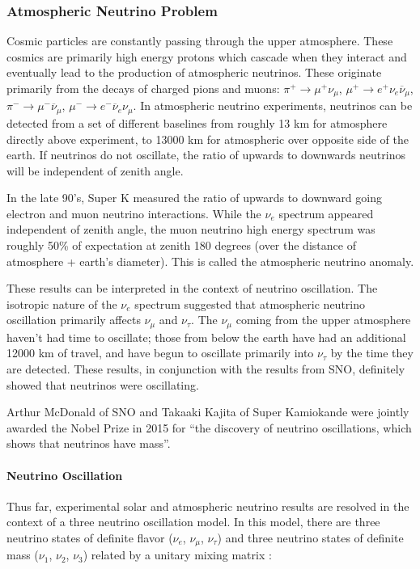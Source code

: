 \subsubsection{Atmospheric Neutrino Problem}
Cosmic particles are constantly passing through the upper atmosphere.  These cosmics are primarily high energy protons which cascade when they interact and eventually lead to the production of atmospheric neutrinos.  These originate primarily from the decays of charged pions and muons: $\pi^+ \rightarrow \mu^+\nu_\mu$, $\mu^+ \rightarrow e^+ \nu_e \overline{\nu}_\mu$, $\pi^- \rightarrow \mu^-\overline{\nu}_\mu$, $\mu^- \rightarrow e^- \overline{\nu}_e \nu_\mu$.  In atmospheric neutrino experiments, neutrinos can be detected from a set of different baselines from roughly 13 km for atmosphere directly above experiment, to 13000 km for atmospheric over opposite side of the earth.  If neutrinos do not oscillate, the ratio of upwards to downwards neutrinos will be independent of zenith angle.
\par In the late 90's, Super K measured the ratio of upwards to downward going electron and muon neutrino interactions.  While the $\nu_e$ spectrum appeared independent of zenith angle, the muon neutrino high energy spectrum was roughly 50\% of expectation at zenith 180 degrees (over the distance of atmosphere + earth's diameter). This is called the atmospheric neutrino anomaly. 
\par These results can be interpreted in the context of neutrino oscillation.  The isotropic nature of the $\nu_e$ spectrum suggested that atmospheric neutrino oscillation primarily affects $\nu_\mu$ and $\nu_\tau$.  The $\nu_\mu$ coming from the upper atmosphere haven't had time to oscillate; those from below the earth have had an additional 12000 km of travel, and have begun to oscillate primarily into $\nu_\tau$ by the time they are detected.  These results, in conjunction with the results from SNO, definitely showed that neutrinos were oscillating.

\par Arthur McDonald of SNO and Takaaki Kajita of Super Kamiokande were jointly awarded the Nobel Prize in 2015 for ``the discovery of neutrino oscillations, which shows that neutrinos have mass''.

\paragraph{Neutrino Oscillation}
Thus far, experimental solar and atmospheric neutrino results are resolved in the context of a three neutrino oscillation model. In this model, there are three neutrino states of definite flavor ($\nu_e$, $\nu_\mu$, $\nu_\tau$) and three neutrino states of definite mass ($\nu_1$, $\nu_2$, $\nu_3$) related by a unitary mixing matrix : 

